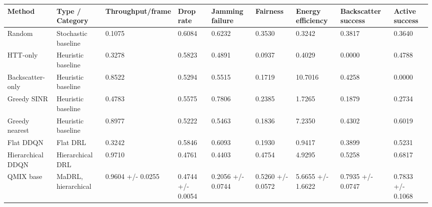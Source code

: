 \begin{tabular}{lllllllll}
\hline
Method & Type / Category & Throughput/frame & Drop rate & Jamming failure & Fairness & Energy efficiency & Backscatter success & Active success \\
\hline
Random & Stochastic baseline & 0.1075 & 0.6084 & 0.6232 & 0.3530 & 0.3242 & 0.3817 & 0.3640 \\
HTT-only & Heuristic baseline & 0.3278 & 0.5823 & 0.4891 & 0.0937 & 0.4029 & 0.0000 & 0.4788 \\
Backscatter-only & Heuristic baseline & 0.8522 & 0.5294 & 0.5515 & 0.1719 & 10.7016 & 0.4258 & 0.0000 \\
Greedy SINR & Heuristic baseline & 0.4783 & 0.5575 & 0.7806 & 0.2385 & 1.7265 & 0.1879 & 0.2734 \\
Greedy nearest & Heuristic baseline & 0.8977 & 0.5222 & 0.5463 & 0.1836 & 7.2350 & 0.4302 & 0.6019 \\
Flat DDQN & Flat DRL & 0.3242 & 0.5846 & 0.6093 & 0.1930 & 0.9417 & 0.3899 & 0.5231 \\
Hierarchical DDQN & Hierarchical DRL & 0.9710 & 0.4761 & 0.4403 & 0.4754 & 4.9295 & 0.5258 & 0.6817 \\
QMIX base & MaDRL, hierarchical & 0.9604 +/- 0.0255 & 0.4744 +/- 0.0054 & 0.2056 +/- 0.0744 & 0.5260 +/- 0.0572 & 5.6655 +/- 1.6622 & 0.7935 +/- 0.0747 & 0.7833 +/- 0.1068 \\
\hline
\end{tabular}
